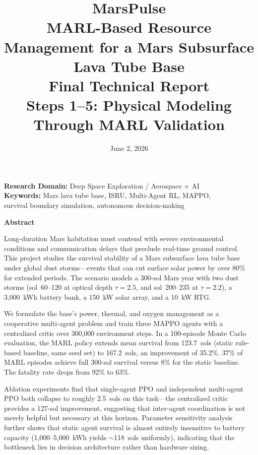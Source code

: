 \documentclass[11pt,a4paper]{article}
\title{
  \vspace{2cm}
  {\huge\textbf{MarsPulse}}\\[8pt]
  {\Large MARL-Based Resource Management for a Mars Subsurface Lava Tube Base}\\[20pt]
  \large Final Technical Report\\[5pt]
  \normalsize Steps 1--5: Physical Modeling Through MARL Validation
}
\author{}
\date{June 2, 2026}
\begin{document}
\maketitle
\thispagestyle{empty}

\vspace{3cm}
\begin{center}
  \large
  \textbf{Research Domain:} Deep Space Exploration / Aerospace + AI \\
  \textbf{Keywords:} Mars lava tube base, ISRU, Multi-Agent RL, MAPPO,\\
  survival boundary simulation, autonomous decision-making
\end{center}

\newpage

\begin{center}
  \Large\textbf{Abstract}
\end{center}
\vspace{8pt}

Long-duration Mars habitation must contend with severe environmental conditions and communication delays that preclude real-time ground control. This project studies the survival stability of a Mars subsurface lava tube base under global dust storms---events that can cut surface solar power by over 80\% for extended periods. The scenario models a 300-sol Mars year with two dust storms (sol~60--120 at optical depth $\tau=2.5$, and sol~200--235 at $\tau=2.2$), a 3,000~kWh battery bank, a 150~kW solar array, and a 10~kW RTG.

We formulate the base's power, thermal, and oxygen management as a cooperative multi-agent problem and train three MAPPO agents with a centralized critic over 300,000 environment steps. In a 100-episode Monte Carlo evaluation, the MARL policy extends mean survival from 123.7~sols (static rule-based baseline, same seed set) to 167.2~sols, an improvement of 35.2\%. 37\% of MARL episodes achieve full 300-sol survival versus 8\% for the static baseline. The fatality rate drops from 92\% to 63\%.

Ablation experiments find that single-agent PPO and independent multi-agent PPO both collapse to roughly 2.5~sols on this task---the centralized critic provides a 127-sol improvement, suggesting that inter-agent coordination is not merely helpful but necessary at this horizon. Parameter sensitivity analysis further shows that static agent survival is almost entirely insensitive to battery capacity (1,000--5,000~kWh yields $\sim$118~sols uniformly), indicating that the bottleneck lies in decision architecture rather than hardware sizing.
\end{document}
